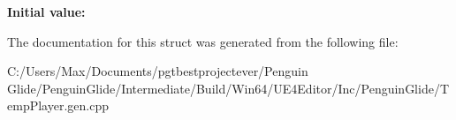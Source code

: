 {\bfseries Initial value\+:}
\begin{DoxyCode}{0}
\DoxyCodeLine{= \{}
\DoxyCodeLine{    \}}

\end{DoxyCode}


The documentation for this struct was generated from the following file\+:\begin{DoxyCompactItemize}
\item 
C\+:/\+Users/\+Max/\+Documents/pgtbestprojectever/\+Penguin Glide/\+Penguin\+Glide/\+Intermediate/\+Build/\+Win64/\+U\+E4\+Editor/\+Inc/\+Penguin\+Glide/Temp\+Player.\+gen.\+cpp\end{DoxyCompactItemize}
